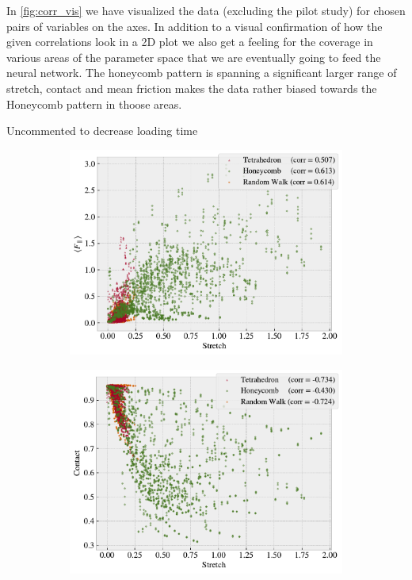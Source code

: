 In \cref{fig:corr_vis} we have visualized the data (excluding the pilot study) for chosen pairs of variables on the axes. In addition to a visual confirmation of how the given correlations look in a 2D plot we also get a feeling for the coverage in various areas of the parameter space that we are eventually going to feed the neural network. The honeycomb pattern is spanning a significant larger range of stretch, contact and mean friction makes the data rather biased towards the Honeycomb pattern in thoose areas. 

Uncommented to decrease loading time
\begin{figure}[H]
  \centering
  \begin{subfigure}[t]{0.49\textwidth}
      \centering
      \includegraphics[width=\textwidth]{figures/ML/corr_stretch_Ff.pdf}
      \caption{}
  \end{subfigure}
  \hfill
  \begin{subfigure}[t]{0.49\textwidth}
      \centering
      \includegraphics[width=\textwidth]{figures/ML/corr_stretch_contact.pdf}

\end{subfigure}
\end{figure}
